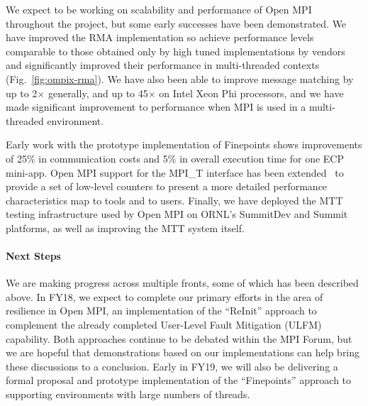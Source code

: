We expect to be working on scalability and performance of Open MPI
throughout the project, but some early successes have been
demonstrated.  We have improved the RMA implementation so achieve
performance levels comparable to those obtained only by high tuned
implementations by vendors and significantly improved their
performance in multi-threaded contexts (Fig.~\ref{fig:ompix-rma}).  We
have also been able to improve message matching by up to 2$\times$
generally, and up to 45$\times$ on Intel Xeon Phi processors, and we
have made significant improvement to performance when MPI is used in a
multi-threaded environment.

Early work with the prototype implementation of Finepoints shows
improvements of 25\% in communication costs and 5\% in overall
execution time for one ECP mini-app.
%
Open MPI support for the MPI\_T interface has been extended~\cite{icl:957} to
provide a set of low-level counters to present a more detailed performance
characteristics map to tools and to users.
%
Finally, we have deployed the MTT testing infrastructure used by Open
MPI on ORNL's SummitDev and Summit platforms, as well as improving the
MTT system itself.

\paragraph{Next Steps}
We are making progress across multiple fronts, some of which has been
described above.  In FY18, we expect to complete our primary efforts
in the area of resilience in Open MPI, an implementation of the
``ReInit'' approach to complement the already completed User-Level
Fault Mitigation (ULFM) capability.  Both approaches continue to be
debated within the MPI Forum, but we are hopeful that demonstrations
based on our implementations can help bring these discussions to a
conclusion. Early in FY19, we will also be delivering a formal
proposal and prototype implementation of the ``Finepoints'' approach to
supporting environments with large numbers of threads.

